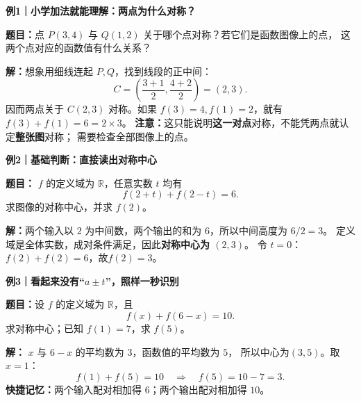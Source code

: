 \clearpage
\begin{examplebox}
\textbf{\textcolor{CExample}{例1｜小学加法就能理解：两点为什么对称？}}



\textbf{题目：}点 $P(3,4)$ 与 $Q(1,2)$ 关于哪个点对称？若它们是函数图像上的点，
这两个点对应的函数值有什么关系？

\textbf{解：}想象用细线连起 $P,Q$，找到线段的正中间：
\[
 C=\left(\frac{3+1}{2},\frac{4+2}{2}\right)=(2,3).
\]
因而两点关于 $C(2,3)$ 对称。如果 $f(3)=4, f(1)=2$，就有
$f(3)+f(1)=6=2\times3$。
\textbf{注意：}这只能说明\textbf{这一对点}对称，不能凭两点就认定\textbf{整张图}对称；
需要检查全部图像上的点。

\medskip

\end{examplebox}
\clearpage
\begin{examplebox}
\textbf{\textcolor{CExample}{例2｜基础判断：直接读出对称中心}}



\textbf{题目：} $f$ 的定义域为 $\mathbb R$，任意实数 $t$ 均有
\[
 f(2+t)+f(2-t)=6.
\]
求图像的对称中心，并求 $f(2)$。

\textbf{解：}两个输入以 $2$ 为中间数，两个输出的和为 $6$，所以中间高度为 $6/2=3$。
定义域是全体实数，成对条件满足，因此\textbf{对称中心为 $(2,3)$}。
令 $t=0$：$f(2)+f(2)=6$，故\textbf{$f(2)=3$}。

\medskip

\end{examplebox}
\clearpage
\begin{examplebox}
\textbf{\textcolor{CExample}{例3｜看起来没有“$a\pm t$”，照样一秒识别}}



\textbf{题目：}设 $f$ 的定义域为 $\mathbb R$，且
\[
 f(x)+f(6-x)=10.
\]
求对称中心；已知 $f(1)=7$，求 $f(5)$。

\textbf{解：} $x$ 与 $6-x$ 的平均数为 $3$，函数值的平均数为 $5$，
所以中心为\textbf{$(3,5)$}。取 $x=1$：
\[
 f(1)+f(5)=10\quad\Rightarrow\quad f(5)=10-7=\boxed{3}.
\]
\textbf{快捷记忆：}两个输入配对相加得 $6$；两个输出配对相加得 $10$。

\medskip

\end{examplebox}
\clearpage
